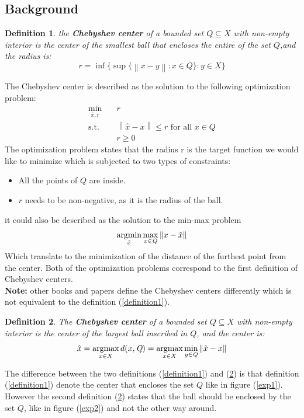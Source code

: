 \documentclass[]{article}
\newtheorem{definition}{Definition}[]
\newcommand{\norm}[1]{\left\lVert#1\right\rVert}
\newcommand{\Q}[0]{\textit{Q}}
\DeclareMathOperator*{\argmax}{argmax}
\DeclareMathOperator*{\argmin}{argmin}
\begin{document}
\subsection{Background}
\begin{definition}
	the \textbf{Chebyshev center}\cite{convexOptimization} of a bounded set $\textit{Q}\subseteq X$ with non-empty interior is the center of the smallest ball that encloses the entire of the set $\Q$,and the radius is:
	\begin{equation*}
		r=\inf\{\sup\{\norm{x-y}:x\in\Q\}:y\in X\}
	\end{equation*}
\end{definition}
The Chebyshev center is described as the solution to the following optimization problem:
\begin{equation}
	\label{OP1}
	\begin{aligned}
		\min_{\hat{x},r} \quad &r \\
		\text{s.t.}\quad &\norm{\hat{x} - x} \leq r \text{ for all }x\in\Q \\
		\quad & r\geq 0
	\end{aligned}
\end{equation}
The optimization problem states that the radius r is the target function we would like to minimize which is subjected to two types of constraints:
\begin{itemize}
	\item All the points of $\Q$ are inside.
	\item $r$ needs to be non-negative, as it is the radius of the ball.
\end{itemize}
it could also be described as the solution to the min-max problem
\begin{equation}
	\label{OP2}
	\argmin_{\hat{x}} \max_{x\in\Q} \space \norm{x-\hat{x}}
\end{equation}
Which translate to the minimization of the distance of the furthest point from the center. Both of the optimization problems correspond to the first definition of Chebyshev centers.\\
\textbf{Note:} other books and papers\cite{ParametricOptimization} define the Chebyshev centers differently which is not equivalent to the definition (\ref{definition1}).
\begin{definition}
	\label{definition2}
	The \textbf{Chebyshev center} of a bounded set $\Q\subseteq X$ with non-empty interior is the center of the largest ball inscribed in $\Q$, and the center is:
	\begin{equation}	
		\hat{x}=\argmax_{x\in X}\space d(x,\Q) = \argmax_{x\in X} \space \min_{y\in \Q} \norm{\hat{x} - x}
	\end{equation}
\end{definition}
The difference between the two definitions (\ref{definition1}) and (\ref{definition2}) is that definition (\ref{definition1}) denote the center that encloses the set $\Q$ like in figure (\ref{exp1}). However the second definition (\ref{definition2}) states that the ball should be enclosed by the set $\Q$, like in figure (\ref{exp2}) and not the other way around.
\end{document}
